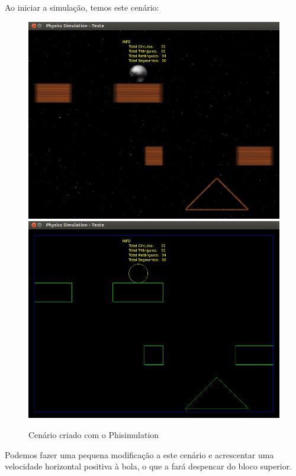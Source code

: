 Ao iniciar a simulação, temos este cenário:

\begin{figure}[H]
	\centering
	\includegraphics[scale=0.2]{images/cenario-monografia.png}
	\includegraphics[scale=0.2]{images/cenario-monografiaE.png}
	\caption{Cenário criado com o Phisimulation}
\end{figure}

Podemos fazer uma pequena modificação a este cenário e acrescentar uma velocidade horizontal positiva à bola, o que a fará despencar do bloco superior. 

